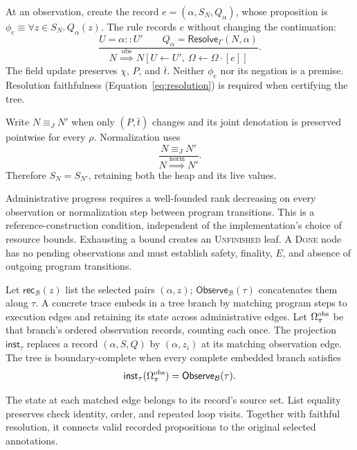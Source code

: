 At an observation, create the record
$e=(\alpha,S_N,Q_\alpha)$, whose proposition is
$\phi_e\equiv\forall z\in S_N.\,Q_\alpha(z)$.
The rule records $e$ without changing the continuation:
\begin{equation}
\label{eq:observe}
\frac{U=\alpha::U'\qquad Q_\alpha=\mathsf{Resolve}_{\Gamma}(N,\alpha)}
 {N\ \overset{\mathrm{obs}}{\Longrightarrow}\
  N[U\gets U',\ \Omega\gets\Omega\mathbin{\cdot}[e]]}.
\end{equation}
The field update preserves $\chi$, $P$, and $\bar t$. Neither $\phi_e$
nor its negation is a premise. Resolution faithfulness
(Equation~\eqref{eq:resolution}) is required when certifying the tree.

Write $N\equiv_JN'$ when only $(P,\bar t)$ changes and its joint
denotation is preserved pointwise for every $\rho$. Normalization uses
\[
 \frac{N\equiv_JN'}{N\overset{\mathrm{norm}}{\Longrightarrow}N'} .
\]
Therefore $S_N=S_{N'}$, retaining both the heap and its live values.

Administrative progress requires a well-founded rank decreasing on
every observation or normalization step between program transitions.
This is a reference-construction condition, independent of the
implementation's choice of resource bounds. Exhausting a bound creates an
\textsc{Unfinished} leaf. A \textsc{Done} node has no pending observations
and must establish safety, finality, $E$, and absence of outgoing
program transitions.

\begin{definition}
Let $\mathsf{rec}_{\mathcal B}(z)$ list the selected pairs $(\alpha,z)$;
$\mathsf{Observe}_{\mathcal B}(\tau)$ concatenates them along $\tau$.
A concrete trace embeds in a tree branch by matching program steps to
execution edges and retaining its state across administrative edges.
Let $\Omega^{\rm obs}_\pi$ be that branch's ordered observation records,
counting each once. The projection $\mathsf{inst}_{\tau}$ replaces a
record $(\alpha,S,Q)$ by $(\alpha,z_i)$ at its matching observation edge.
The tree is boundary-complete when every complete embedded branch satisfies
\[
 \mathsf{inst}_{\tau}(\Omega^{\rm obs}_\pi)
       =\mathsf{Observe}_{\mathcal B}(\tau).
\]
\end{definition}
The state at each matched edge belongs to its record's source set.
List equality preserves check identity, order, and repeated loop visits.
Together with faithful resolution, it connects valid recorded propositions
to the original selected annotations.

